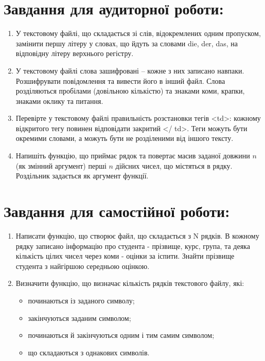 \documentclass[a5paper,titlepage,openany,twoside,
]
{book_unv}%
\begin{document}
\begin{enumerate}
\begin{itemize}
\end{itemize}

\section{Завдання для аудиторної роботи:}

\begin{enumerate}
\def\labelenumi{\arabic{enumi})}
\item
  У текстовому файлі, що складається зі слів, відокремлених одним пропуском,
  замінити першу літеру у словах, що йдуть за словами die, der, das, на
  відповідну літеру верхнього регістру.
\item
  У текстовому файлі слова зашифровані -- кожне з них записано навпаки.
  Розшифрувати повідомлення та вивести його в інший файл. 
 Слова розділяються пробілами (довільною кількістю)
  та знаками коми, крапки, знаками оклику та питання. 
\item
 Перевірте у текстовому файлі правильність
  розстановки тегів \textless{}td\textgreater{}: кожному відкритого тегу
  повинен відповідати закритий \textless{}/ td\textgreater{}. Теги можуть бути
окремими словами, а можуть бути  не розділеними від іншого тексту.

\item
  Напишіть функцію, що приймає рядок та повертає масив заданої довжини $n$ (як
  змінний аргумент) перші $n$ дійсних чисел, що містяться в рядку. Роздільник
  задається як аргумент функції.
\end{enumerate}

\section{Завдання для самостійної роботи:}

\begin{enumerate}
\def\labelenumi{\arabic{enumi})}
\setcounter{enumi}{4}

\item
  Написати функцію, що створює файл, що складається з N рядків. В кожному рядку
записано інформацію про студента - прізвище, курс, група, та деяка 
кількість цілих чисел через коми - оцінки за іспити.
Знайти прізвище студента з найгіршою середньою оцінкою.

\item
Визначити функцію, що визначає кількість рядків текстового файлу,
які:
\begin{itemize}
\item починаються із заданого символу;
\item закінчуються заданим символом;
\item починаються й закінчуються одним і тим самим символом;
\item що складаються з однакових символів.
\end{itemize}


\end{enumerate}
\end{enumerate}
\end{document}

